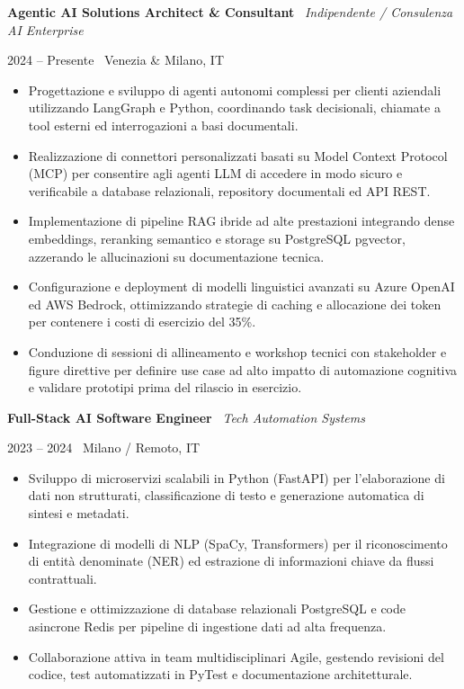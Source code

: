 \documentclass[a4paper,10pt]{article}
\newcommand{\role}[4]{%
  \vspace{2pt}\noindent
  \begin{minipage}[t]{0.70\textwidth}\raggedright\textbf{#1} \textbullet\ \textit{#3}\end{minipage}%
  \hfill
  \begin{minipage}[t]{0.28\textwidth}\raggedleft\footnotesize\color{gray}#2 \textbullet\ #4\end{minipage}%
  \vspace{1pt}%
}
\begin{document}
\role{Agentic AI Solutions Architect \& Consultant}{2024 -- Presente}{Indipendente / Consulenza AI Enterprise}{Venezia \& Milano, IT}
\begin{itemize}
  \item Progettazione e sviluppo di agenti autonomi complessi per clienti aziendali utilizzando LangGraph e Python, coordinando task decisionali, chiamate a tool esterni ed interrogazioni a basi documentali.
  \item Realizzazione di connettori personalizzati basati su Model Context Protocol (MCP) per consentire agli agenti LLM di accedere in modo sicuro e verificabile a database relazionali, repository documentali ed API REST.
  \item Implementazione di pipeline RAG ibride ad alte prestazioni integrando dense embeddings, reranking semantico e storage su PostgreSQL pgvector, azzerando le allucinazioni su documentazione tecnica.
  \item Configurazione e deployment di modelli linguistici avanzati su Azure OpenAI ed AWS Bedrock, ottimizzando strategie di caching e allocazione dei token per contenere i costi di esercizio del 35\%.
  \item Conduzione di sessioni di allineamento e workshop tecnici con stakeholder e figure direttive per definire use case ad alto impatto di automazione cognitiva e validare prototipi prima del rilascio in esercizio.
\end{itemize}

\vspace{3pt}
\role{Full-Stack AI Software Engineer}{2023 -- 2024}{Tech Automation Systems}{Milano / Remoto, IT}
\begin{itemize}
  \item Sviluppo di microservizi scalabili in Python (FastAPI) per l'elaborazione di dati non strutturati, classificazione di testo e generazione automatica di sintesi e metadati.
  \item Integrazione di modelli di NLP (SpaCy, Transformers) per il riconoscimento di entità denominate (NER) ed estrazione di informazioni chiave da flussi contrattuali.
  \item Gestione e ottimizzazione di database relazionali PostgreSQL e code asincrone Redis per pipeline di ingestione dati ad alta frequenza.
  \item Collaborazione attiva in team multidisciplinari Agile, gestendo revisioni del codice, test automatizzati in PyTest e documentazione architetturale.
\end{itemize}
\end{document}
